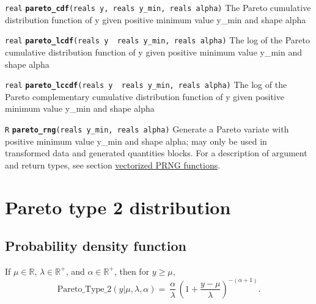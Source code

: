 \documentclass[
  10pt,
]{book}
\begin{document}

\texttt{real} \textbf{\texttt{pareto\_cdf}}\texttt{(reals\ y,\ reals\ y\_min,\ reals\ alpha)}\newline
The Pareto cumulative distribution function of y given positive
minimum value y\_min and shape alpha


\texttt{real} \textbf{\texttt{pareto\_lcdf}}\texttt{(reals\ y\ \textbar{}\ reals\ y\_min,\ reals\ alpha)}\newline
The log of the Pareto cumulative distribution function of y given
positive minimum value y\_min and shape alpha


\texttt{real} \textbf{\texttt{pareto\_lccdf}}\texttt{(reals\ y\ \textbar{}\ reals\ y\_min,\ reals\ alpha)}\newline
The log of the Pareto complementary cumulative distribution function
of y given positive minimum value y\_min and shape alpha


\texttt{R} \textbf{\texttt{pareto\_rng}}\texttt{(reals\ y\_min,\ reals\ alpha)}\newline
Generate a Pareto variate with positive minimum value y\_min and shape
alpha; may only be used in transformed data and generated quantities blocks. For a
description of argument and return types, see section
\protect\hyperlink{prng-vectorization}{vectorized PRNG functions}.

\hypertarget{pareto-type-2-distribution}{%
\section{Pareto type 2 distribution}\label{pareto-type-2-distribution}}

\hypertarget{probability-density-function-19}{%
\subsection{Probability density function}\label{probability-density-function-19}}

If \(\mu \in \mathbb{R}\), \(\lambda \in \mathbb{R}^+\), and \(\alpha \in \mathbb{R}^+\), then for \(y \geq \mu\), \[
\mathrm{Pareto\_Type\_2}(y|\mu,\lambda,\alpha) = \
\frac{\alpha}{\lambda} \, \left( 1+\frac{y-\mu}{\lambda}
\right)^{-(\alpha+1)} \! . \]
\end{document}
